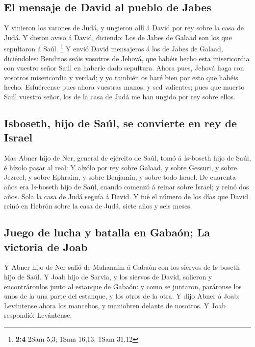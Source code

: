 \hypertarget{el-mensaje-de-david-al-pueblo-de-jabes}{%
\subsection{El mensaje de David al pueblo de
Jabes}\label{el-mensaje-de-david-al-pueblo-de-jabes}}

 Y vinieron los varones de Judá, y ungieron allí á David por
rey sobre la casa de Judá. Y dieron aviso á David, diciendo: Los de
Jabes de Galaad son los que sepultaron á Saúl. \footnote{\textbf{2:4}
  2Sam 5,3; 1Sam 16,13; 1Sam 31,12}  Y envió David
mensajeros á los de Jabes de Galaad, diciéndoles: Benditos seáis
vosotros de Jehová, que habéis hecho esta misericordia con vuestro señor
Saúl en haberle dado sepultura.  Ahora pues, Jehová haga con
vosotros misericordia y verdad; y yo también os haré bien por esto que
habéis hecho.  Esfuércense pues ahora vuestras manos, y sed
valientes; pues que muerto Saúl vuestro señor, los de la casa de Judá me
han ungido por rey sobre ellos.

\hypertarget{isboseth-hijo-de-sauxfal-se-convierte-en-rey-de-israel}{%
\subsection{Isboseth, hijo de Saúl, se convierte en rey de
Israel}\label{isboseth-hijo-de-sauxfal-se-convierte-en-rey-de-israel}}

 Mas Abner hijo de Ner, general de ejército de Saúl, tomó á
Is-boseth hijo de Saúl, é hízolo pasar al real:  Y alzólo
por rey sobre Galaad, y sobre Gessuri, y sobre Jezreel, y sobre Ephraim,
y sobre Benjamín, y sobre todo Israel.  De cuarenta años
era Is-boseth hijo de Saúl, cuando comenzó á reinar sobre Israel; y
reinó dos años. Sola la casa de Judá seguía á David.  Y fué
el número de los días que David reinó en Hebrón sobre la casa de Judá,
siete años y seis meses.

\hypertarget{juego-de-lucha-y-batalla-en-gabauxf3n-la-victoria-de-joab}{%
\subsection{Juego de lucha y batalla en Gabaón; La victoria de
Joab}\label{juego-de-lucha-y-batalla-en-gabauxf3n-la-victoria-de-joab}}

 Y Abner hijo de Ner salió de Mahanaim á Gabaón con los
siervos de Is-boseth hijo de Saúl.  Y Joab hijo de Sarvia,
y los siervos de David, salieron y encontráronlos junto al estanque de
Gabaón: y como se juntaron, paráronse los unos de la una parte del
estanque, y los otros de la otra.  Y dijo Abner á Joab:
Levántense ahora los mancebos, y maniobren delante de nosotros. Y Joab
respondió: Levántense.

